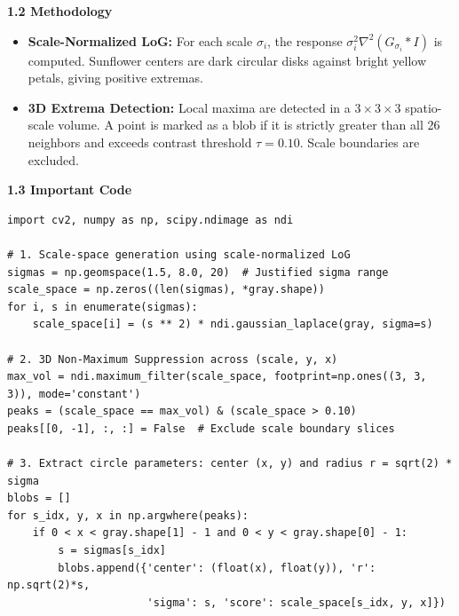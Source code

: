 \documentclass[10pt]{article}
\begin{document}
	\vspace{0.1cm}
	\noindent\textbf{1.2 Methodology}
	\begin{itemize}[leftmargin=*, nosep]
		\item \textbf{Scale-Normalized LoG:} For each scale $\sigma_i$, the response $\sigma_i^2 \nabla^2(G_{\sigma_i} * I)$ is computed. Sunflower centers are dark circular disks against bright yellow petals, giving positive extremas.
		\item \textbf{3D Extrema Detection:} Local maxima are detected in a $3 \times 3 \times 3$ spatio-scale volume. A point is marked as a blob if it is strictly greater than all 26 neighbors and exceeds contrast threshold $\tau = 0.10$. Scale boundaries are excluded.
	\end{itemize}

	\vspace{0.1cm}
	\noindent\textbf{1.3 Important Code}
	\vspace{-0.15cm}
\begin{lstlisting}
import cv2, numpy as np, scipy.ndimage as ndi

# 1. Scale-space generation using scale-normalized LoG
sigmas = np.geomspace(1.5, 8.0, 20)  # Justified sigma range
scale_space = np.zeros((len(sigmas), *gray.shape))
for i, s in enumerate(sigmas):
    scale_space[i] = (s ** 2) * ndi.gaussian_laplace(gray, sigma=s)

# 2. 3D Non-Maximum Suppression across (scale, y, x)
max_vol = ndi.maximum_filter(scale_space, footprint=np.ones((3, 3, 3)), mode='constant')
peaks = (scale_space == max_vol) & (scale_space > 0.10)
peaks[[0, -1], :, :] = False  # Exclude scale boundary slices

# 3. Extract circle parameters: center (x, y) and radius r = sqrt(2) * sigma
blobs = []
for s_idx, y, x in np.argwhere(peaks):
    if 0 < x < gray.shape[1] - 1 and 0 < y < gray.shape[0] - 1:
        s = sigmas[s_idx]
        blobs.append({'center': (float(x), float(y)), 'r': np.sqrt(2)*s,
                      'sigma': s, 'score': scale_space[s_idx, y, x]})
\end{lstlisting}
	
\end{document}
